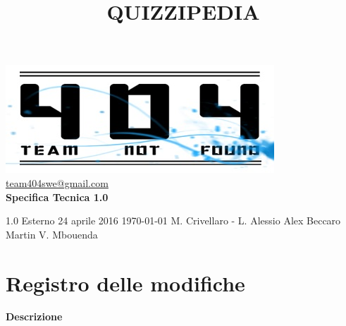 \documentclass[a4paper,11pt]{article}
\title{\textbf{{\fontsize{8mm}{5mm}\selectfont QUIZZIPEDIA}}}
\date{}
\author{}
\begin{document}
	\maketitle
	\thispagestyle{empty}
	\begin{center}	
	\includegraphics{../team_not_found.jpg}\\
	\fontsize{5mm}{3mm}\url{team404swe@gmail.com}\\
	
	\vspace{50mm}
	\textbf{Specifica Tecnica 1.0}
	\end{center}
			{1.0} 							%
			{Esterno} 						%
			{24 aprile 2016} 				%
			{\today} 						%
			{M. Crivellaro - L. Alessio}	%
			{Alex Beccaro } 			%
			{Martin V. Mbouenda} 				%
	\newpage
	\thispagestyle{empty}
	\null  %

	\newpage
	\newpage
	\fancyfoot[R]{\thepage}
	
	\hspace{30 mm}
	\section*{Registro delle modifiche}
	
	\beginregistro
			 {\hspace{5 mm} \textbf{Descrizione}}
	
			
	\fineregistro
	\newpage
	\fancyhead[R]{\leftmark} %
	\tableofcontents
	\newpage
	\listoffigures
	\listoftables
	
\end{document}
